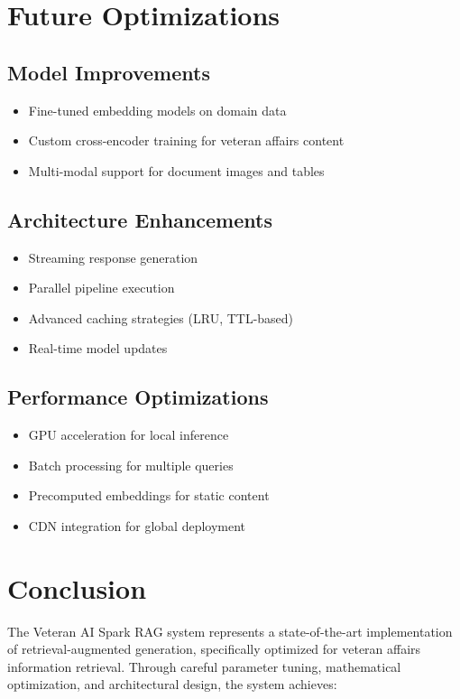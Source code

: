 \documentclass[11pt,a4paper]{article}
\begin{document}
\section{Future Optimizations}

\subsection{Model Improvements}
\begin{itemize}
    \item Fine-tuned embedding models on domain data
    \item Custom cross-encoder training for veteran affairs content
    \item Multi-modal support for document images and tables
\end{itemize}

\subsection{Architecture Enhancements}
\begin{itemize}
    \item Streaming response generation
    \item Parallel pipeline execution
    \item Advanced caching strategies (LRU, TTL-based)
    \item Real-time model updates
\end{itemize}

\subsection{Performance Optimizations}
\begin{itemize}
    \item GPU acceleration for local inference
    \item Batch processing for multiple queries
    \item Precomputed embeddings for static content
    \item CDN integration for global deployment
\end{itemize}

\section{Conclusion}

The Veteran AI Spark RAG system represents a state-of-the-art implementation of retrieval-augmented generation, specifically optimized for veteran affairs information retrieval. Through careful parameter tuning, mathematical optimization, and architectural design, the system achieves:
\end{document}
